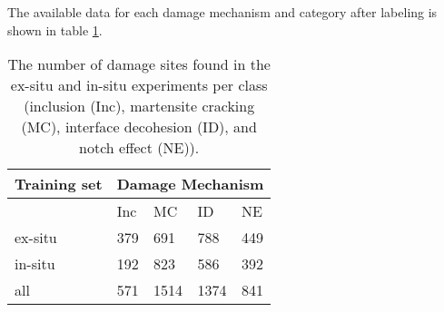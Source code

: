 The available data for each damage mechanism and category after labeling is shown in table \ref{tab:Dataset}.


\begin{table}[H]
\begin{center}
\begin{tabular}{@{} *5l @{}} \toprule[2pt]
Training set &  \multicolumn{4}{c}{Damage Mechanism}   \\\midrule
 & Inc & MC & ID & NE   \\ 
ex-situ  & 379 & 691 & 788 & 449\\ 
in-situ  & 192 & 823 & 586 & 392 \\ \bottomrule
all  & 571 & 1514 & 1374 & 841\\\bottomrule[2pt]

\end{tabular}
 \caption{The number of damage sites found in the ex-situ and in-situ experiments per class (inclusion (Inc), martensite cracking (MC), interface decohesion (ID), and notch effect (NE)).}
 \label{tab:Dataset}
\end{center}
\end{table}